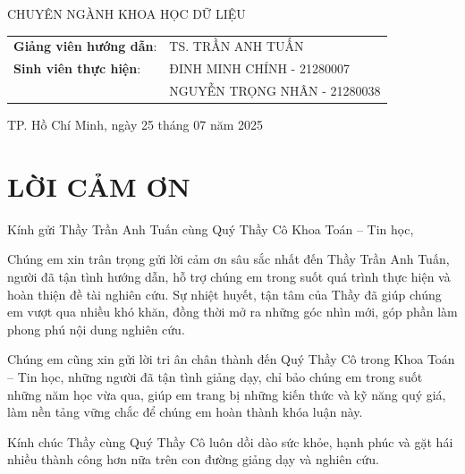 \documentclass{article}
\begin{document}
\begin{center}
    \vspace{0.5cm}
    \fontsize{16pt}{0pt}\selectfont CHUYÊN NGÀNH KHOA HỌC DỮ LIỆU
    \vspace{0.8cm}
    \begin{table}[H]
        \centering
        \begin{tabular}{l l}
            \fontsize{14pt}{0pt}\selectfont \textbf{Giảng viên hướng dẫn}: & \fontsize{14pt}{0pt}\selectfont TS. TRẦN ANH TUẤN \vspace{12pt} \\ 
            \fontsize{14pt}{0pt}\selectfont \textbf{Sinh viên thực hiện}: & \fontsize{14pt}{0pt}\selectfont ĐINH MINH CHÍNH - 21280007 \vspace{4pt}\\
            & \fontsize{14pt}{0pt}\selectfont NGUYỄN TRỌNG NHÂN - 21280038 \vspace{4pt}\\ 
        \end{tabular}
    \end{table}
    
    \vspace{1cm}
    \fontsize{14pt}{0pt}\selectfont TP. Hồ Chí Minh, ngày 25 tháng 07 năm 2025
\end{center}

\cleardoublepage
{}
{}
\section*{LỜI CẢM ƠN}
Kính gửi Thầy Trần Anh Tuấn cùng Quý Thầy Cô Khoa Toán – Tin học,

Chúng em xin trân trọng gửi lời cảm ơn sâu sắc nhất đến Thầy Trần Anh Tuấn, người đã tận tình hướng dẫn, hỗ trợ chúng em trong suốt quá trình thực hiện và hoàn thiện đề tài nghiên cứu. Sự nhiệt huyết, tận tâm của Thầy đã giúp chúng em vượt qua nhiều khó khăn, đồng thời mở ra những góc nhìn mới, góp phần làm phong phú nội dung nghiên cứu.

Chúng em cũng xin gửi lời tri ân chân thành đến Quý Thầy Cô trong Khoa Toán – Tin học, những người đã tận tình giảng dạy, chỉ bảo chúng em trong suốt những năm học vừa qua, giúp em trang bị những kiến thức và kỹ năng quý giá, làm nền tảng vững chắc để chúng em hoàn thành khóa luận này.

Kính chúc Thầy cùng Quý Thầy Cô luôn dồi dào sức khỏe, hạnh phúc và gặt hái nhiều thành công hơn nữa trên con đường giảng dạy và nghiên cứu.
\cleardoublepage
{}
{}
\end{document}
